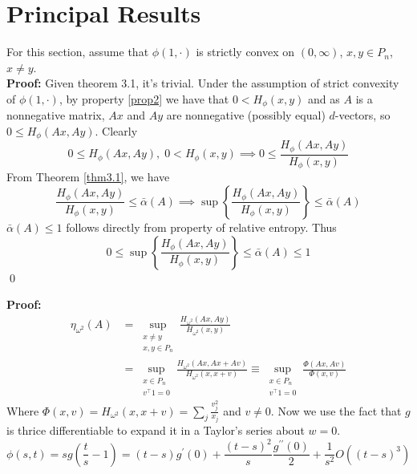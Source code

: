 \section{Principal Results}\label{results}
\noindent For this section, assume that $\phi(1, \cdot)$ is strictly convex on $(0, \infty)$, $x,y \in P_n$, $x \neq y$.\\
\label{thm3.1}
\label{thm4.1}
\noindent\textbf{Proof:} Given theorem 3.1, it's trivial. Under the assumption of strict convexity of $\phi(1, \cdot)$, by property \ref{prop2} we have that $0 < H_\phi(x, y)$ and as $A$ is a nonnegative matrix, $Ax$ and $Ay$ are nonnegative (possibly equal) $d$-vectors, so $0 \leq H_\phi(Ax, Ay)$. Clearly
    \[0 \leq H_\phi(Ax, Ay), \; 0<H_\phi(x,y) \implies 0\leq \frac{H_\phi(Ax, Ay)}{H_\phi(x,y)}\]
    From Theorem \ref{thm3.1}, we have
    \[\frac{H_\phi(Ax, Ay) }{H_\phi(x,y)}\leq \bar{\alpha}(A) \implies \sup \left\{\frac{H_\phi(Ax, Ay)}{H_\phi(x,y)}\right\} \leq \bar{\alpha}(A)\]
$\bar{\alpha}(A) \leq 1$ follows directly from property \label{prop4} of relative entropy. Thus 
\[ 0 \leq \sup \left\{\frac{H_\phi(Ax, Ay)}{H_\phi(x,y)}\right\} \leq \bar{\alpha}(A) \leq 1 \]
\qed \\
\addtocounter{defc}{3}
\label{thm5.4}
\noindent\textbf{Proof:}
\begin{align}
    \eta_{\omega^2}(A) &= \sup_{\substack{x \neq y \\x,y \in P_n}} \frac{H_{\omega^2}(Ax, Ay)}{H_{\omega^2}(x,y)} \nonumber\\
    &= \sup_{\substack{x \in P_n \\ v^\top 1 = 0}} \frac{H_{\omega^2}(Ax, Ax + Av)}{H_{\omega^2}(x, x + v)} \equiv \sup_{\substack{x \in P_n \\ v^\top 1 = 0}}\frac{\Phi(Ax, Av)}{\Phi(x,v)} \label{helper_thm5.4}
\end{align}
Where $\Phi(x,v) = H_{\omega^2}(x, x + v) = \sum_j \frac{v_j^2}{x_j}$ and $v \neq 0$. Now we use the fact that $g$ is thrice differentiable to expand it in a Taylor's series about $w = 0$.
\[\phi(s,t) = sg\left(\frac{t}{s} - 1\right) = (t-s)g^\prime(0) + \frac{(t - s)^2}{s}\frac{g^{\prime\prime}(0)}{2} + \frac{1}{s^2}O\left((t - s)^3\right)\]
